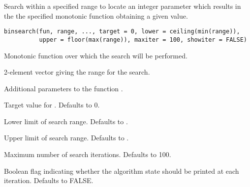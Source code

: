 \begin{Description}\relax
Search within a specified range to locate an integer parameter which
results in the the specified monotonic function obtaining a given value.
\end{Description}
\begin{Usage}
\begin{verbatim}
binsearch(fun, range, ..., target = 0, lower = ceiling(min(range)),
          upper = floor(max(range)), maxiter = 100, showiter = FALSE)
\end{verbatim}
\end{Usage}
\begin{Arguments}
\begin{ldescription}
\item[\code{fun}] Monotonic function over which the search will be performed.
\item[\code{range}] 2-element vector giving the range for the search.
\item[\code{...}] Additional parameters to the function .
\item[\code{target}] Target value for .  Defaults to 0.
\item[\code{lower}] Lower limit of search range. Defaults to .
\item[\code{upper}] Upper limit of search range. Defaults to .
\item[\code{maxiter}] Maximum number of search iterations. Defaults to 100.
\item[\code{showiter}] Boolean flag indicating whether the algorithm state
should be printed at each iteration. Defaults to FALSE.
\end{ldescription}
\end{Arguments}
